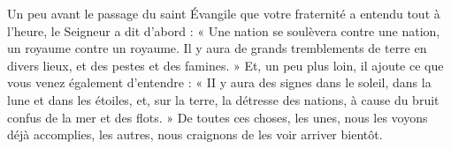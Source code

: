 Un peu avant le passage du saint Évangile que votre fraternité a entendu tout à l’heure, le Seigneur a dit d’abord : « Une nation se soulèvera contre une nation, un royaume contre un royaume. Il y aura de grands tremblements de terre en divers lieux, et des pestes et des famines. » Et, un peu plus loin, il ajoute ce que vous venez également d’entendre : « II y aura des signes dans le soleil, dans la lune et dans les étoiles, et, sur la terre, la détresse des nations, à cause du bruit confus de la mer et des flots. » De toutes ces choses, les unes, nous les voyons déjà accomplies, les autres, nous craignons de les voir arriver bientôt.
